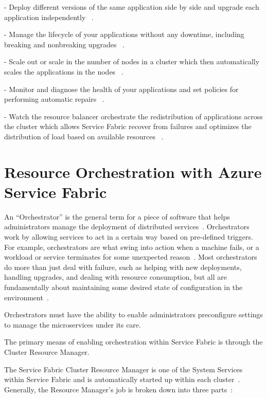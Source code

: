 - Deploy different versions of the same 
  application side by side and
  upgrade each application independently
~\cite{hid-sp18-501-overview}.

- Manage the lifecycle of your applications 
  without any downtime,
  including breaking and nonbreaking upgrades
~\cite{hid-sp18-501-overview}.

- Scale out or scale in the number of nodes 
  in a cluster which then automatically scales
  the applications in the nodes
~\cite{hid-sp18-501-overview}.

- Monitor and diagnose the health 
  of your applications and set
  policies for performing automatic repairs
~\cite{hid-sp18-501-overview}.

- Watch the resource balancer orchestrate 
  the redistribution of applications across 
  the cluster which allows Service Fabric 
  recover from
  failures and optimizes the distribution 
  of load based on available resources
~\cite{hid-sp18-501-overview}.


\section{Resource Orchestration with Azure Service Fabric}
An ``Orchestrator'' is the general term for a piece of software that
helps administrators manage the deployment of distributed
services~\cite{hid-sp18-501-fig2and3}. Orchestrators work by allowing 
services to act in a certain
way based on pre-defined triggers. For example, 
orchestrators are what
swing into action when a machine fails, or a workload or service
terminates for some unexpected reason~\cite{hid-sp18-501-fig2and3}. Most 
orchestrators do more than
just deal with failure, such as helping with new deployments, handling
upgrades, and dealing with resource consumption, but all are
fundamentally about maintaining some desired state of configuration in
the environment~\cite{hid-sp18-501-fig2and3}.
 
Orchestrators must have the ability to enable administrators
preconfigure settings to manage the microservices
under its care.

The primary means of enabling orchestration within Service Fabric is
through the Cluster Resource Manager.

The Service Fabric Cluster Resource Manager is one of the System
Services within Service Fabric and is automatically started up within
each cluster~\cite{hid-sp18-501-fig2and3}.  
Generally, the Resource Manager's job is broken down
into three parts~\cite{hid-sp18-501-fig2and3}:


